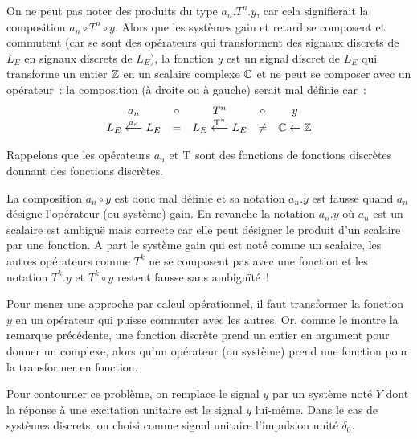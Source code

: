 \begin{remarque}
  On ne peut pas noter des produits du type $a_n.T^n.y$, car cela
  signifierait la composition $a_n\circ T^n\circ y$. Alors que les
  systèmes gain et retard se composent et commutent (car se sont des
  opérateurs qui transforment des signaux discrets de $L_E$ en signaux
  discrets de $L_E$), la fonction $y$ est un signal discret de $L_E$
  qui transforme un entier $\mathbb{Z}$ en un scalaire complexe $\mathbb{C}$ et ne
  peut se composer avec un opérateur~: la composition (à droite ou à
  gauche) serait mal définie car~:
  \begin{equation*}
    \begin{array}{ccccc}
      a_n   & \circ &   T^n  & \circ &  y \\
      L_E \overset{a_n}{\longleftarrow} L_E & =  & L_E \overset{\mathrm{T}^n}{\longleftarrow} L_E & \neq  & \mathbb{C} \leftarrow \mathbb{Z} 
    \end{array}
  \end{equation*}

  Rappelons que les opérateurs $a_n$ et $\mathrm{T}$ sont des
  \og{}fonctions de fonctions discrètes donnant des fonctions
  discrètes\fg{}.

  La composition $a_n\circ y$ est donc mal définie et sa notation
  $a_n.y$ est fausse quand $a_n$ désigne l'opérateur (ou système)
  gain. En revanche la notation $a_n.y$ où $a_n$ est un scalaire est
  ambiguë mais correcte car elle peut désigner le produit d'un
  scalaire par une fonction. A part le système gain qui est noté comme
  un scalaire, les autres opérateurs comme $T^k$ ne se composent pas
  avec une fonction et les notation $T^k.y$ et $T^k\circ y$ restent
  fausse sans ambiguïté~!
\end{remarque}



Pour mener une approche par calcul opérationnel, il faut transformer
la fonction $y$ en un opérateur qui puisse commuter avec les autres.
Or, comme le montre la remarque précédente, une fonction discrète prend
un entier en argument pour donner un complexe, alors qu'un opérateur
(ou système) prend une fonction pour la transformer en fonction.

Pour contourner ce problème, on remplace le signal $y$ par un système
noté $Y$ dont la réponse à une excitation unitaire est le signal $y$
lui-même. Dans le cas de systèmes discrets, on choisi comme signal
unitaire l'impulsion unité $\delta_{0}$.

